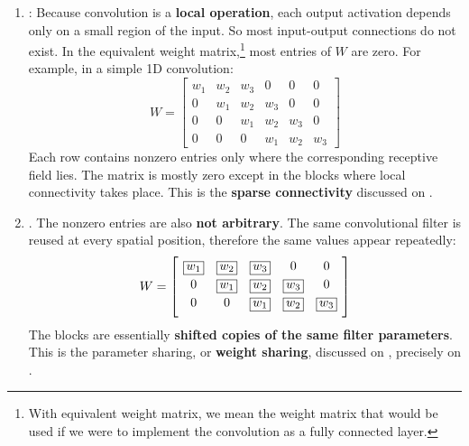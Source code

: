 \begin{enumerate}
    \item {}: Because convolution is a \textbf{local operation}, each output activation depends only on a small region of the input. So most input-output connections do not exist. In the equivalent weight matrix,\footnote{%
        With equivalent weight matrix, we mean the weight matrix that would be used if we were to implement the convolution as a fully connected layer.%
    } most entries of $W$ are zero. For example, in a simple 1D convolution:
    \begin{equation*}
        W = \begin{bmatrix}
            w_1 & w_2 & w_3 & 0 & 0 & 0 \\
            0 & w_1 & w_2 & w_3 & 0 & 0 \\
            0 & 0 & w_1 & w_2 & w_3 & 0 \\
            0 & 0 & 0 & w_1 & w_2 & w_3
        \end{bmatrix}
    \end{equation*}
    Each row contains nonzero entries only where the corresponding receptive field lies.
    The matrix is mostly zero except in the blocks where local connectivity takes place.
    This is the \textbf{sparse connectivity} discussed on .


    \item {}. The nonzero entries are also \textbf{not arbitrary}. The same convolutional filter is reused at every spatial position, therefore the same values appear repeatedly:
    \begin{equation*}
        \begingroup
        \setlength{\fboxsep}{2pt}
        \renewcommand{\arraystretch}{1.2}
        W = \left[\begin{array}{@{\hspace{4pt}}ccccc@{\hspace{4pt}}}
            \boxed{w_1} & \boxed{w_2} & \boxed{w_3} & 0 & 0 \\
            0 & \boxed{w_1} & \boxed{w_2} & \boxed{w_3} & 0 \\
            0 & 0 & \boxed{w_1} & \boxed{w_2} & \boxed{w_3} \\[.4em]
        \end{array}\right]
        \endgroup
    \end{equation*}
    The blocks are essentially \textbf{shifted copies of the same filter parameters}. This is the parameter sharing, or \textbf{weight sharing}, discussed on , precisely on .
    

\end{enumerate}
